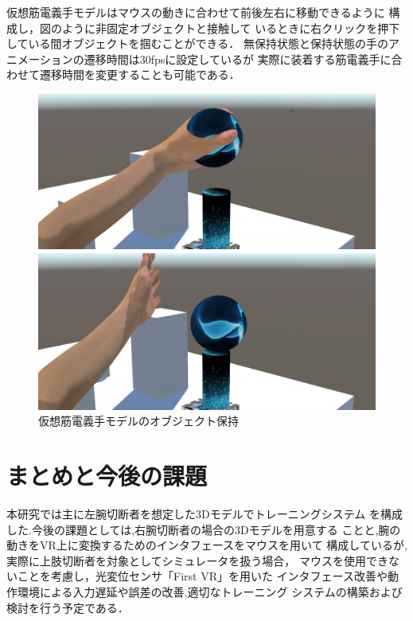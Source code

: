 \documentclass{ltjsarticle}
\begin{document}
		仮想筋電義手モデルはマウスの動きに合わせて前後左右に移動できるように
		構成し，図のように非固定オブジェクトと接触して
		いるときに右クリックを押下している間オブジェクトを掴むことができる．
		無保持状態と保持状態の手のアニメーションの遷移時間は30fpsに設定しているが
		実際に装着する筋電義手に合わせて遷移時間を変更することも可能である．

		\begin{figure}[H]
		\centering
		\begin{minipage}{0.4\columnwidth}
		\centering
		\includegraphics[width = \columnwidth]{figs/spheregrap2.png}
		\end{minipage}
		\hspace{0.05\columnwidth}
		\begin{minipage}{0.4\columnwidth}
		\centering
		\includegraphics[width = \columnwidth]{figs/spherereleace.png}
		\end{minipage}
		\vspace{-10pt}
		\caption{仮想筋電義手モデルのオブジェクト保持}
		\label{fig:spheregrap}
		\end{figure}
		\vspace{-32pt}

\section{まとめと今後の課題}
	本研究では主に左腕切断者を想定した3Dモデルでトレーニングシステム
	を構成した.今後の課題としては,右腕切断者の場合の3Dモデルを用意する
	ことと,腕の動きをVR上に変換するためのインタフェースをマウスを用いて
	構成しているが,実際に上肢切断者を対象としてシミュレータを扱う場合，
	マウスを使用できないことを考慮し，光変位センサ「First VR」を用いた
	インタフェース改善や動作環境による入力遅延や誤差の改善,適切なトレーニング
	システムの構築および検討を行う予定である．
\vspace{-12pt}
\end{document}

